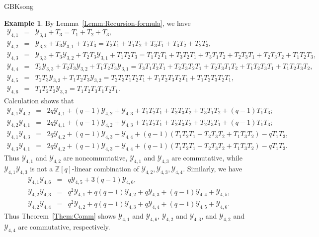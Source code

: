 \documentclass[13pt,a4paper, oneside]{amsart}       %
\numberwithin{equation}{section}
\theoremstyle{definition}
\newtheorem{example}[equation]{Example}
\theoremstyle{remark}
\begin{document}
\begin{CJK*}{GBK}{song}
\begin{example}\label{Exam:n=4}By Lemma~\ref{Lemm:Recursion-formula}, we have
 \begin{eqnarray*}
 \mathscr{Y}_{4,1}&=&\mathscr{Y}_{3,1}+T_3=T_1+T_2+T_3,\\
\mathscr{Y}_{4,2}&=&\mathscr{Y}_{3,2}+T_3\mathscr{Y}_{3,1}+T_2T_3
=T_2T_1+T_1T_2+T_3T_1+T_3T_2+T_2T_3,\\
 \mathscr{Y}_{4,3}&=&\mathscr{Y}_{3,3}+T_3\mathscr{Y}_{3,2}
 +T_2T_3\mathscr{Y}_{3,1}+T_1T_2T_3=T_1T_2T_1+
 T_3T_2T_1+T_3T_1T_2+T_2T_3T_1+T_2T_3T_2+T_1T_2T_3,\\
 \mathscr{Y}_{4,4}&=&T_3\mathscr{Y}_{3,3}+T_2T_3\mathscr{Y}_{3,2}
 +T_1T_2T_3\mathscr{Y}_{3,1}=T_3T_1T_2T_1+T_2T_3T_2T_1+
 T_2T_3T_1T_2+T_1T_2T_3T_1+T_1T_2T_3T_2,\\
 \mathscr{Y}_{4,5}&=&T_2T_3\mathscr{Y}_{3,3}+T_1T_2T_3\mathscr{Y}_{3,2}
 =T_2T_3T_1T_2T_1+T_1T_2T_3T_2T_1+T_1T_2T_3T_2T_1,\\
\mathscr{Y}_{4,6}&=&T_1T_2T_3\mathscr{Y}_{3,3}=T_1T_2T_3T_1T_2T_1.
 \end{eqnarray*}
Calculation  shows that
\begin{eqnarray*}
\mathscr{Y}_{4,1}\mathscr{Y}_{4,2}&=&2q\mathscr{Y}_{4,1}+(q-1)\mathscr{Y}_{4,2}+
\mathscr{Y}_{4,3}+T_1T_2T_1+T_2T_3T_2+T_3T_1T_2+(q-1)T_1T_3;\\
\mathscr{Y}_{4,2}\mathscr{Y}_{4,1}&=&2q\mathscr{Y}_{4,1}+(q-1)\mathscr{Y}_{4,2}+
\mathscr{Y}_{4,3}+T_1T_2T_1+T_2T_3T_2+T_2T_3T_1+(q-1)T_1T_3;\\
\mathscr{Y}_{4,1}\mathscr{Y}_{4,3}&=&2q\mathscr{Y}_{4,2}+(q-1)\mathscr{Y}_{4,3}
+\mathscr{Y}_{4,4}+(q-1)(T_1T_2T_1+T_2T_3T_2+T_1T_3T_2)-qT_1T_3,\\
\mathscr{Y}_{4,3}\mathscr{Y}_{4,1}&=&2q\mathscr{Y}_{4,2}+(q-1)\mathscr{Y}_{4,3}
+\mathscr{Y}_{4,4}+(q-1)(T_1T_2T_1+T_2T_3T_2+T_1T_3T_2)-qT_1T_3.
\end{eqnarray*}
Thus
 $\mathscr{Y}_{4,1}$ and $\mathscr{Y}_{4,2}$ are noncommutative, $\mathscr{Y}_{4,1}$ and $\mathscr{Y}_{4,3}$ are commutative, while $\mathscr{Y}_{4,1}\mathscr{Y}_{4,3}$ is not a $\mathbb{Z}[q]$-linear combination of $\mathscr{Y}_{4,2}, \mathscr{Y}_{4,3}, \mathscr{Y}_{4,4}$.
Similarly, we  have
\begin{eqnarray*}
\mathscr{Y}_{4,1}\mathscr{Y}_{4,6}&=&q\mathscr{Y}_{4,5}+
3(q-1)\mathscr{Y}_{4,6},\\
\mathscr{Y}_{4,2}\mathscr{Y}_{4,3}&=&q^2\mathscr{Y}_{4,1}
+q(q-1)\mathscr{Y}_{4,2}+q\mathscr{Y}_{4,3}+(q-1)\mathscr{Y}_{4,4}
+\mathscr{Y}_{4,5},\\
\mathscr{Y}_{4,2}\mathscr{Y}_{4,4}&=&q^2\mathscr{Y}_{4,2}
+q(q-1)\mathscr{Y}_{4,3}+q\mathscr{Y}_{4,4}+(q-1)\mathscr{Y}_{4,5}
+\mathscr{Y}_{4,6}.
\end{eqnarray*}
Thus Theorem~\ref{Them:Comm} shows $\mathscr{Y}_{4,1}$ and $\mathscr{Y}_{4,6}$,  $\mathscr{Y}_{4,2}$ and $\mathscr{Y}_{4,3}$, and $\mathscr{Y}_{4,2}$ and $\mathscr{Y}_{4,4}$ are commutative, respectively.
\end{example}



\end{CJK*}
\end{document}
